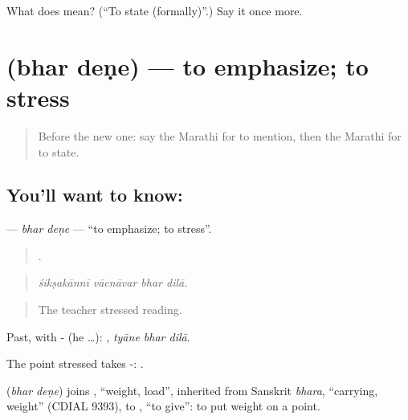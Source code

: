 \begin{tcolorbox}[breakable,colback=teal!4,colframe=teal!35!black,title={Before you move on}]
What does   mean? (\textquotedblleft{}To state (formally)\textquotedblright{}.) Say it once more.
\end{tcolorbox}
\section[\texorpdfstring{\mr{भर} \mr{देणे} (bhar deṇe)}{भर देणे (bhar deṇe)}]{  (bhar deṇe) — to emphasize; to stress}

\label{lesson:MR-C352-bhar-dene}



\begin{quote}
Before the new one: say the Marathi for to mention, then the Marathi for to state.
\end{quote}

\subsection*{You'll want to know:  }
\textbf{ } — \emph{bhar deṇe} — \textquotedblleft{}to emphasize; to stress\textquotedblright{}.

\begin{quote}
   .
\end{quote}

\begin{quote}
\emph{śikṣakānnī vācnāvar bhar dilā.}
\end{quote}

\begin{quote}
The teacher stressed reading.
\end{quote}

Past, with - (he …):   , \emph{tyāne bhar dilā}.

The point stressed takes -:   .

\begin{cousinweb}
\textbf{ } (\emph{bhar deṇe}) joins , \textquotedblleft{}weight, load\textquotedblright{}, inherited from Sanskrit \emph{bhara}, \textquotedblleft{}carrying, weight\textquotedblright{} (CDIAL 9393), to , \textquotedblleft{}to give\textquotedblright{}: to put weight on a point.
\end{cousinweb}

